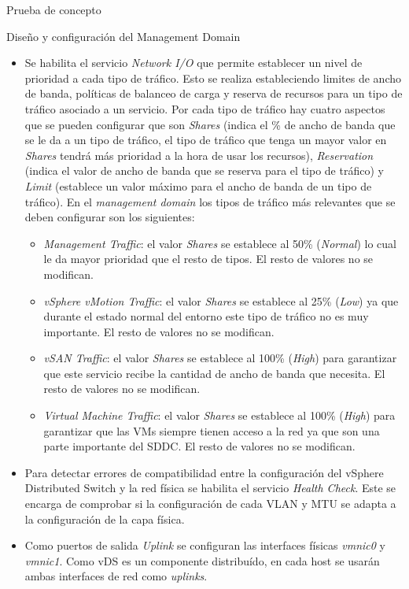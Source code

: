 \begin{section}{Prueba de concepto}
\begin{subsection}{Diseño y configuración del Management Domain}
\begin{itemize}
        \item Se habilita el servicio \textit{Network I/O} que permite establecer un nivel de prioridad a cada tipo de tráfico. Esto se realiza estableciendo limites de ancho de banda, políticas de balanceo de carga y reserva de recursos para un tipo de tráfico asociado a un servicio. Por cada tipo de tráfico hay cuatro aspectos que se pueden configurar que son \textit{Shares} (indica el \% de ancho de banda que se le da a un tipo de tráfico, el tipo de tráfico que tenga un mayor valor en \textit{Shares} tendrá más prioridad a la hora de usar los recursos), \textit{Reservation} (indica el valor de ancho de banda que se reserva para el tipo de tráfico) y \textit{Limit} (establece un valor máximo para el ancho de banda de un tipo de tráfico). En el \textit{management domain} los tipos de tráfico más relevantes que se deben configurar son los siguientes:
        \begin{itemize}
          \item \textit{Management Traffic}: el valor \textit{Shares} se establece al 50\% (\textit{Normal}) lo cual le da mayor prioridad que el resto de tipos. El resto de valores no se modifican.
          \item \textit{vSphere vMotion Traffic}: el valor \textit{Shares} se establece al 25\% (\textit{Low}) ya que durante el estado normal del entorno este tipo de tráfico no es muy importante. El resto de valores no se modifican.
          \item \textit{vSAN Traffic}: el valor \textit{Shares} se establece al 100\% (\textit{High}) para garantizar que este servicio recibe la cantidad de ancho de banda que necesita. El resto de valores no se modifican.
          \item \textit{Virtual Machine Traffic}: el valor \textit{Shares} se establece al 100\% (\textit{High}) para garantizar que las VMs siempre tienen acceso a la red ya que son una parte importante del SDDC. El resto de valores no se modifican.
        \end{itemize}
        
        \item Para detectar errores de compatibilidad entre la configuración del vSphere Distributed Switch y la red física se habilita el servicio \textit{Health Check}. Este se encarga de comprobar si la configuración de cada VLAN y MTU se adapta a la configuración de la capa física.
        
        \item Como puertos de salida \textit{Uplink} se configuran las interfaces físicas \textit{vmnic0} y \textit{vmnic1}. Como vDS es un componente distribuído, en cada host se usarán ambas interfaces de red como \textit{uplinks}.
        

\end{itemize}
\end{subsection}
\end{section}
